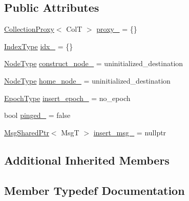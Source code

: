 \subsection*{Public Attributes}
\begin{DoxyCompactItemize}
\item 
\hyperlink{structvt_1_1vrt_1_1collection_1_1_collection_proxy}{Collection\+Proxy}$<$ ColT $>$ \hyperlink{structvt_1_1vrt_1_1collection_1_1_insert_msg_aafebebf63eb0e3b61f1b800a9663065e}{proxy\+\_\+} = \{\}
\item 
\hyperlink{structvt_1_1vrt_1_1collection_1_1_insert_msg_a6d0f0e849ba09859a0cda3e4785de16b}{Index\+Type} \hyperlink{structvt_1_1vrt_1_1collection_1_1_insert_msg_aa694e0805d2e5b253d18c9430fa74ae5}{idx\+\_\+} = \{\}
\item 
\hyperlink{namespacevt_a866da9d0efc19c0a1ce79e9e492f47e2}{Node\+Type} \hyperlink{structvt_1_1vrt_1_1collection_1_1_insert_msg_a0e6be53d3c93e511f44d5a62fdf7a4e2}{construct\+\_\+node\+\_\+} = uninitialized\+\_\+destination
\item 
\hyperlink{namespacevt_a866da9d0efc19c0a1ce79e9e492f47e2}{Node\+Type} \hyperlink{structvt_1_1vrt_1_1collection_1_1_insert_msg_a8ce98733c640a3fdfe5a1870f6945040}{home\+\_\+node\+\_\+} = uninitialized\+\_\+destination
\item 
\hyperlink{namespacevt_a81d11b28122d43bf9834577e4a06440f}{Epoch\+Type} \hyperlink{structvt_1_1vrt_1_1collection_1_1_insert_msg_ab00f3ff128fbe31ab7e7163248b2ac15}{insert\+\_\+epoch\+\_\+} = no\+\_\+epoch
\item 
bool \hyperlink{structvt_1_1vrt_1_1collection_1_1_insert_msg_a9b0a68bf8f23b5d377581e1e55ba5a50}{pinged\+\_\+} = false
\item 
\hyperlink{namespacevt_ab2b3d506ec8e8d1540aede826d84a239}{Msg\+Shared\+Ptr}$<$ MsgT $>$ \hyperlink{structvt_1_1vrt_1_1collection_1_1_insert_msg_aed7412452e22de28daa6cc73a4a0acef}{insert\+\_\+msg\+\_\+} = nullptr
\end{DoxyCompactItemize}
\subsection*{Additional Inherited Members}


\subsection{Member Typedef Documentation}
\mbox{\label{structvt_1_1vrt_1_1collection_1_1_insert_msg_a6d0f0e849ba09859a0cda3e4785de16b}} 
